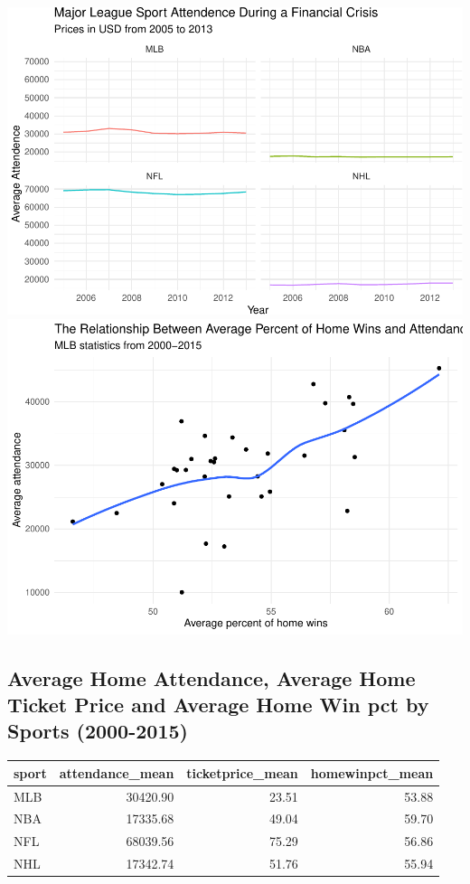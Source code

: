 \documentclass[man, fleqn, noextraspace,floatsintext]{apa6}
\begin{document}
\includegraphics{Final_Project_files/figure-latex/unnamed-chunk-1-1.pdf}
\includegraphics{Final_Project_files/figure-latex/unnamed-chunk-1-2.pdf}

\subsection{Average Home Attendance, Average Home Ticket Price and
Average Home Win pct by Sports
(2000-2015)}\label{average-home-attendance-average-home-ticket-price-and-average-home-win-pct-by-sports-2000-2015}

\begin{tabular}{l|r|r|r}
\hline
sport & attendance\_mean & ticketprice\_mean & homewinpct\_mean\\
\hline
MLB & 30420.90 & 23.51 & 53.88\\
\hline
NBA & 17335.68 & 49.04 & 59.70\\
\hline
NFL & 68039.56 & 75.29 & 56.86\\
\hline
NHL & 17342.74 & 51.76 & 55.94\\
\hline
\end{tabular}
\end{document}
